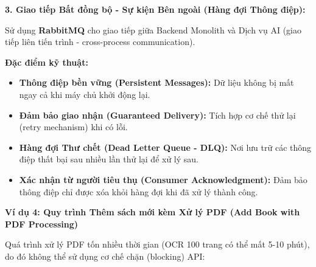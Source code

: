 \textbf{3. Giao tiếp Bất đồng bộ - Sự kiện Bên ngoài (Hàng đợi Thông điệp):}

Sử dụng \textbf{RabbitMQ} cho giao tiếp giữa Backend Monolith và Dịch vụ AI (giao tiếp liên tiến trình - cross-process communication).

\textbf{Đặc điểm kỹ thuật:}
\begin{itemize}
    \item \textbf{Thông điệp bền vững (Persistent Messages):} Dữ liệu không bị mất ngay cả khi máy chủ khởi động lại.
    \item \textbf{Đảm bảo giao nhận (Guaranteed Delivery):} Tích hợp cơ chế thử lại (retry mechanism) khi có lỗi.
    \item \textbf{Hàng đợi Thư chết (Dead Letter Queue - DLQ):} Nơi lưu trữ các thông điệp thất bại sau nhiều lần thử lại để xử lý sau.
    \item \textbf{Xác nhận từ người tiêu thụ (Consumer Acknowledgment):} Đảm bảo thông điệp chỉ được xóa khỏi hàng đợi khi đã xử lý thành công.
\end{itemize}

\textbf{Ví dụ 4: Quy trình Thêm sách mới kèm Xử lý PDF (Add Book with PDF Processing)}

Quá trình xử lý PDF tốn nhiều thời gian (OCR 100 trang có thể mất 5-10 phút), do đó không thể sử dụng cơ chế chặn (blocking) API:

